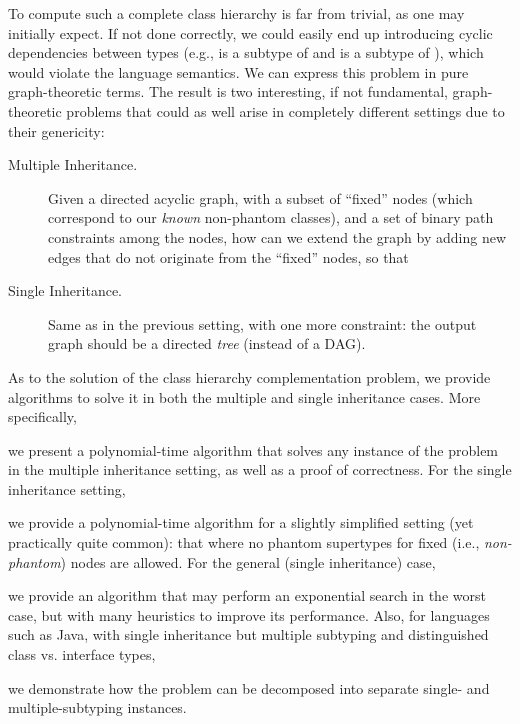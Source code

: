 To compute such a complete class hierarchy is far from trivial, as one
may initially expect. If not done correctly, we could easily end up
introducing cyclic dependencies between types (e.g.,  is a
subtype of  and  is a subtype of ), which
would violate the language semantics. We can express this problem in
pure graph-theoretic terms. The result is two interesting, if not
fundamental, graph-theoretic problems that could as well arise in
completely different settings due to their genericity:

\begin{description}
\item[Multiple Inheritance.] Given a directed acyclic graph, with a
  subset of ``fixed'' nodes (which correspond to our \emph{known}
  non-phantom classes), and a set of binary path constraints among the
  nodes, how can we extend the graph by adding new edges that do not
  originate from the ``fixed'' nodes, so that
\item [Single Inheritance.] Same as in the previous setting, with one
  more constraint: the output graph should be a directed \emph{tree}
  (instead of a DAG).
\end{description}

As to the solution of the class hierarchy complementation problem, we
provide algorithms to solve it in both the multiple and single
inheritance cases. More specifically,
\begin{inparaenum}[(1)]
\item we present a polynomial-time algorithm that solves any instance
  of the problem in the multiple inheritance setting, as well as a
  proof of correctness.
  For the single inheritance setting,
\item we provide a polynomial-time algorithm for a slightly simplified
  setting (yet practically quite common): that where no phantom
  supertypes for fixed (i.e., \emph{non-phantom}) nodes are allowed.
  For the general (single inheritance) case,
\item we provide an algorithm that may perform an exponential search
  in the worst case, but with many heuristics to improve its
  performance.
  Also, for languages such as Java, with single inheritance but
  multiple subtyping and distinguished class vs.  interface types,
\item we demonstrate how the problem can be decomposed into separate
  single- and multiple-subtyping instances.
\end{inparaenum}


